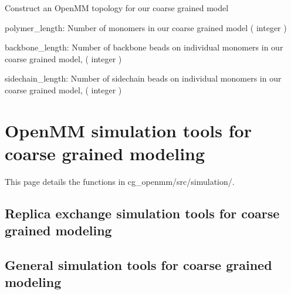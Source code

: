 \documentclass[letterpaper,12pt,english,openany,oneside]{sphinxmanual}
\begin{document}

\begin{fulllineitems}
\label{\detokenize{build:build.cg_build.build_topology}}
Construct an OpenMM topology for our coarse grained model

polymer\_length: Number of monomers in our coarse grained model
( integer )

backbone\_length: Number of backbone beads on individual monomers
in our coarse grained model, ( integer )

sidechain\_length: Number of sidechain beads on individual monomers
in our coarse grained model, ( integer )

\end{fulllineitems}



\chapter{OpenMM simulation tools for coarse grained modeling}
\label{\detokenize{simulation:openmm-simulation-tools-for-coarse-grained-modeling}}\label{\detokenize{simulation::doc}}
This page details the functions in cg\_openmm/src/simulation/.


\section{Replica exchange simulation tools for coarse grained modeling}
\label{\detokenize{simulation:replica-exchange-simulation-tools-for-coarse-grained-modeling}}

\section{General simulation tools for coarse grained modeling}
\label{\detokenize{simulation:module-simulation.tools}}\label{\detokenize{simulation:general-simulation-tools-for-coarse-grained-modeling}}
\end{document}
